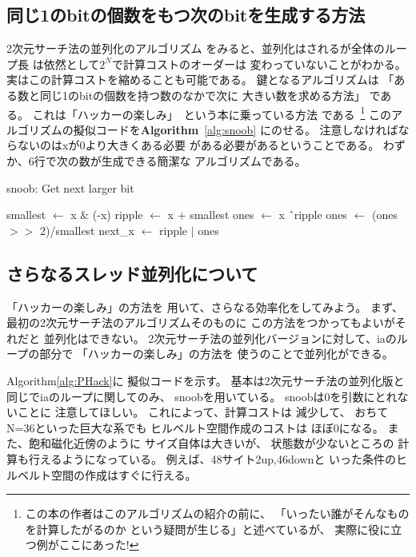 \documentclass[prb,aps,showpacs,preprint,nofootinbib]{revtex4}
\newcommand{\lef}{\leftarrow}
\begin{document}
\newpage
\subsection{同じ1のbitの個数をもつ次のbitを生成する方法}
\label{sec:snoob}
2次元サーチ法の並列化のアルゴリズム
をみると、並列化はされるが全体のループ長
は依然として$2^{N}$で計算コストのオーダーは
変わっていないことがわかる。
実はこの計算コストを縮めることも可能である。
鍵となるアルゴリズムは
「ある数と同じ1のbitの個数を持つ数のなかで次に
大きい数を求める方法」
である。
これは「ハッカーの楽しみ」~\cite{hacker,hacker_jp}という本に乗っている方法
である~\footnote{この本の作者はこのアルゴリズムの紹介の前に、
「いったい誰がそんなものを計算したがるのか
という疑問が生じる」と述べているが、
実際に役に立つ例がここにあった!}
このアルゴリズムの擬似コードを{\bf Algorithm}~\ref{alg:snoob}
にのせる。
注意しなければならないのはxが0より大きくある必要
がある必要があるということである。
わずか、6行で次の数が生成できる簡潔な
アルゴリズムである。

\begin{algorithm}                      
\caption{snoob: Get next larger bit}         
\begin{algorithmic}                  
\STATE smallest $\lef$ x $\&$ (-x)
\STATE ripple $\lef$ x $+$ smallest
\STATE ones $\lef$ x \^\ ripple
\STATE ones $\lef$ (ones $>>$ 2)/smallest
\STATE next\_x $\lef$ ripple $|$ ones
\end{algorithmic}
\label{alg:snoob}                          
\end{algorithm}


\subsection{さらなるスレッド並列化について}
「ハッカーの楽しみ」の方法を
用いて、さらなる効率化をしてみよう。
まず、最初の2次元サーチ法のアルゴリズムそのものに
この方法をつかってもよいがそれだと
並列化はできない。
2次元サーチ法の並列化バージョンに対して、iaのループの部分で
「ハッカーの楽しみ」の方法を
使うのことで並列化ができる。

Algorithm\ref{alg:PHack}に
擬似コードを示す。
基本は2次元サーチ法の並列化版と
同じでiaのループに関してのみ、
snoobを用いている。
snoobは0を引数にとれないことに
注意してほしい。
これによって、計算コストは
減少して、
おちてN=36といった巨大な系でも
ヒルベルト空間作成のコストは
ほぼ0になる。
また、飽和磁化近傍のように
サイズ自体は大きいが、
状態数が少ないところの
計算も行えるようになっている。
例えば、48サイト2up,46downと
いった条件のヒルベルト空間の作成はすぐに行える。
\end{document}
